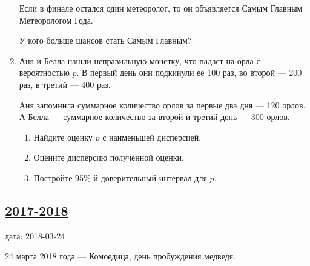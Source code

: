 \begin{enumerate}
Если в финале остался один метеоролог, то он объявляется Самым Главным Метеорологом Года.

У кого больше шансов стать Самым Главным?

\item Аня и Белла нашли неправильную монетку, что падает на орла с вероятностью $p$.
В первый день они подкинули её 100 раз, во второй — 200 раз, в третий — 400 раз.

Аня запомнила суммарное количество орлов за первые два дня — 120 орлов. А Белла —
суммарное количество за второй и третий день — 300 орлов.
\begin{enumerate}
  \item Найдите оценку $p$ с наименьшей дисперсией.
  \item Оцените дисперсию полученной оценки.
  \item Постройте 95\%-й доверительный интервал для $p$.
\end{enumerate}

\end{enumerate}





\subsection[2017-2018]{\hyperref[sec:sol_kr_03_ip_2017_2018]{2017-2018}}
\label{sec:kr_03_ip_2017_2018}

дата: 2018-03-24

24 марта 2018 года — Комоедица, день пробуждения медведя.

